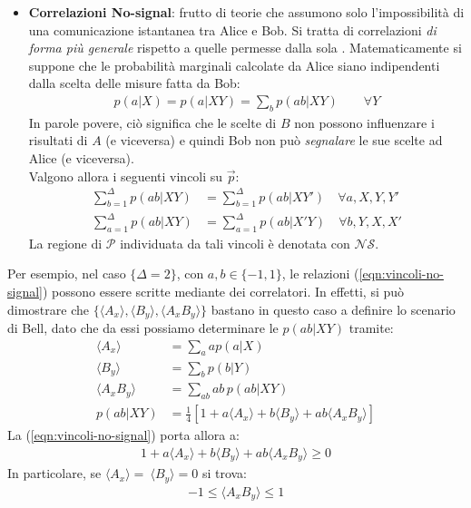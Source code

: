 \documentclass[../../InformazioneQuantistica.tex]{subfiles}
\begin{document}
\begin{itemize}
\item \textbf{Correlazioni No-signal}: frutto di teorie che assumono solo l'impossibilità di una comunicazione istantanea tra Alice e Bob. Si tratta di correlazioni \textit{di forma più generale} rispetto a quelle permesse dalla sola \MQ. Matematicamente si suppone che le probabilità marginali calcolate da Alice siano indipendenti dalla scelta delle misure fatta da Bob:
\begin{align*}
p(a|X)=p(a|XY)=\sum_b p(ab|XY) \qquad \forall Y
\end{align*}
In parole povere, ciò significa che le scelte di $B$ non possono influenzare i risultati di $A$ (e viceversa) e quindi Bob non può \textit{segnalare} le sue scelte ad Alice (e viceversa).\\ 
Valgono allora i seguenti vincoli su $\vec{p}$:
\begin{align}\nonumber
\sum_{b=1}^\Delta p(ab|XY) &= \sum_{b=1}^\Delta p(ab|XY') \quad \forall a, X,Y, Y'\\
\sum_{a=1}^\Delta p(ab|XY) &= \sum_{a=1}^\Delta p(ab|X'Y) \quad \forall b,Y,X,X'
\label{eqn:vincoli-no-signal}
\end{align}
La regione di $\mathcal{P}$ individuata da tali vincoli è denotata con $\mathcal{NS}$.
\end{itemize}

Per esempio, nel caso $\{\Delta =2 \}$, con $a,b\in \{-1,1\}$, le relazioni (\ref{eqn:vincoli-no-signal}) possono essere scritte mediante dei correlatori. In effetti, si può dimostrare che $\{\langle A_x\rangle, \langle B_y\rangle, \langle A_x B_y\rangle \}$ bastano in questo caso a definire lo scenario di Bell, dato che da essi possiamo determinare le $p(ab|XY)$ tramite:
\begin{align*}
\langle A_x\rangle &= \sum_a ap(a|X)\\
\langle B_y \rangle &= \sum_b p(b|Y)\\
\langle A_x B_y\rangle &= \sum_{ab} ab\, p(ab|XY)\\
p(ab|XY) &= \frac{1}{4}[1 + a \langle A_x\rangle + b\langle B_y\rangle + ab\langle A_x B_y \rangle ] 
\end{align*}
La (\ref{eqn:vincoli-no-signal}) porta allora a:
\begin{align*}
1 + a \langle A_x \rangle + b\langle B_y\rangle + ab\langle A_x B_y \rangle \geq 0
\end{align*}
In particolare, se $\langle A_x \rangle =\ \langle B_y\rangle = 0$ si trova:
\begin{align*}
-1 \leq \langle A_x B_y \rangle \leq 1
\end{align*}
\end{document}
